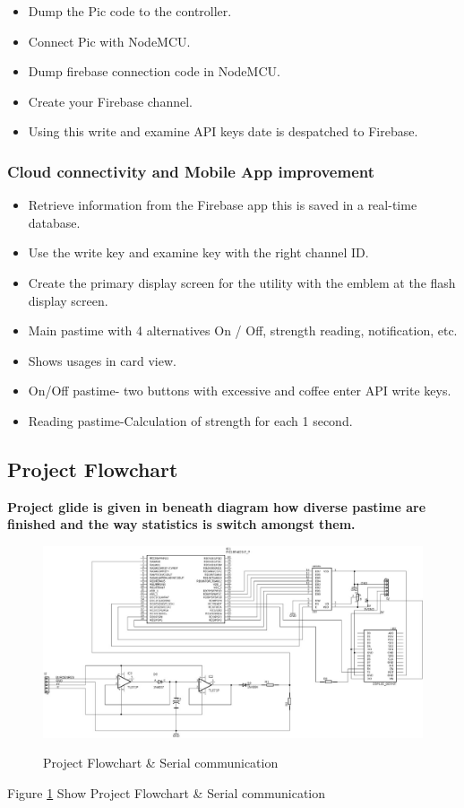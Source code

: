 \documentclass[12pt,a4paper]{article}
\begin{document}
\begin{itemize}
	\item Dump the Pic code to the controller.
	\item Connect Pic with NodeMCU. 
	\item Dump firebase connection code in NodeMCU.
	\item Create your Firebase channel.
	\item Using this write and examine API keys date is despatched to Firebase.
\end{itemize}

\subsubsection{Cloud connectivity and Mobile App improvement}

\begin{itemize}
	\item  Retrieve information from the Firebase app this is saved in a real-time database.
	\item Use the write key and examine key with the right channel ID. 
	\item Create the primary display screen for the utility with the emblem at the flash display screen.
	\item Main pastime with 4 alternatives On / Off, strength reading, notification, etc.
	\item Shows usages in card view.
	\item On/Off pastime- two buttons with excessive and coffee enter API write keys.
	\item Reading pastime-Calculation of strength for each 1 second.
\end{itemize}

\subsection{Project Flowchart}
\textbf{Project glide is given in beneath diagram how diverse pastime are finished and the way statistics is switch amongst them.
}\\

\begin{figure}[H]
	\centering
	\includegraphics[width=\linewidth]{flow_chart.jpeg}\\
	\caption{Project Flowchart \& Serial communication}
	\label{fig 5.2}
\end{figure}
\begin{center}
Figure \ref{fig 5.2} Show Project Flowchart \& Serial communication
\end{center}
\end{document}
